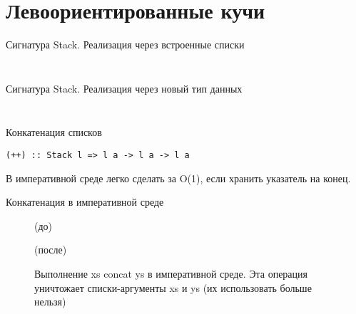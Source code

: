 
\section{Левоориентированные кучи}
\label{sc:3.1}

\begin{frame}[fragile]{Сигнатура Stack. Реализация через встроенные списки}
\begin{minipage}{.48\textwidth}
\inputminted{haskell}{code/Stack.hs}
\end{minipage}
\begin{minipage}{.48\textwidth}
\inputminted{haskell}{code/ListStack.hs}
\end{minipage}
\end{frame}

\begin{frame}[fragile]{Сигнатура Stack. Реализация через новый тип данных}
\begin{minipage}{.48\textwidth}
  \inputminted{haskell}{code/Stack.hs}
\end{minipage}
\begin{minipage}{.48\textwidth}
  \inputminted{haskell}{code/CustomStack.hs}
\end{minipage}
\end{frame}

\begin{frame}[fragile]{Конкатенация списков}
\begin{verbatim}
(++) :: Stack l => l a -> l a -> l a
\end{verbatim}
В императивной среде легко сделать за O(1), если хранить указатель на конец.
\end{frame}

\begin{frame}[fragile]{Конкатенация в императивной среде}
\begin{figure}[h]
	\par
	(до)\par
	\par
	(после)\par
	\caption{Выполнение xs concat ys в императивной среде. Эта операция уничтожает списки-аргументы xs и ys (их использовать больше нельзя)}
	\label{fig:2.4}
\end{figure}
\end{frame}


